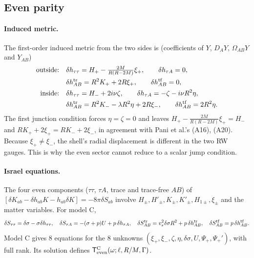 \documentclass[11pt,a4paper]{article}
\numberwithin{equation}{section}
\begin{document}
\subsection{Even parity}\label{sec:even}
\paragraph{Induced metric.} The first-order induced metric from the two sides is (coefficients of $Y$, $D_AY$,
$\Omega_{AB}Y$ and $Y_{AB}$)
\begin{align}
\text{outside:}&\quad \delta h_{\tau\tau}=H_+-\tfrac{2M}{R(R-2M)}\xi_+,\qquad \delta h_{\tau A}=0,\nonumber\\
&\quad \delta h^{\rm tr}_{AB}=R^2K_++2R\xi_+,\qquad \delta h^{\rm tf}_{AB}=0,\nonumber\\
\text{inside:}&\quad \delta h_{\tau\tau}=H_-+2i\nu\zeta,\qquad \delta h_{\tau A}=-\zeta-i\nu R^2\eta,\nonumber\\
&\quad \delta h^{\rm tr}_{AB}=R^2K_--\lambda R^2\eta+2R\xi_-,\qquad \delta h^{\rm tf}_{AB}=2R^2\eta .
\end{align}
The first junction condition forces $\eta=\zeta=0$ and leaves
$H_+-\frac{2M}{R(R-2M)}\xi_+=H_-$ and $RK_++2\xi_+=RK_-+2\xi_-$, in agreement with Pani et al.'s (A16), (A20). Because
$\xi_+\ne\xi_-$, the shell's radial displacement is different in the two RW gauges. This is why the even sector
cannot reduce to a scalar jump condition.

\paragraph{Israel equations.} The four even components ($\tau\tau$, $\tau A$, trace and trace-free $AB$) of
$[\delta K_{ab}-\delta h_{ab}K-h_{ab}\delta K]=-8\pi\delta S_{ab}$ involve $H_\pm,H'_\pm,K_\pm,K'_\pm,H_{1\pm},\xi_\pm$ and
the matter variables. For model C,
\begin{equation}
\delta S_{\tau\tau}=\delta\sigma-\sigma\delta h_{\tau\tau},\quad \delta S_{\tau A}=-(\sigma+p)U+p\,\delta h_{\tau A},\quad
\delta S^{\rm tr}_{AB}=v_s^2\delta\sigma R^2+p\,\delta h^{\rm tr}_{AB},\quad \delta S^{\rm tf}_{AB}=p\,\delta h^{\rm tf}_{AB}.
\end{equation}
Model C gives 8 equations for the 8 unknowns $(\xi_+,\xi_-,\zeta,\eta,\delta\sigma,U,\Psi_+,\Psi_+')$, with full rank.
Its solution defines $\mathsf T^{\rm C}_{\rm even}(\omega;\ell,R/M,\Gamma)$.
\end{document}
